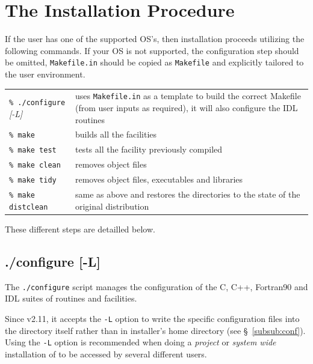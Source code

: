 \documentclass[12pt,twoside]{article}
\begin{document}

\section{The Installation Procedure}

If the user has one of the supported OS's, then installation proceeds utilizing
the following commands. If your OS is not supported, the configuration step
should be omitted, {\tt Makefile.in} should be copied as {\tt Makefile} and explicitly
tailored to the user environment.


\begin{flushright}
\begin{tabular}{p{0.3\hsize} p{0.60\hsize}}
{\tt \% ./configure} {\em [-L]}    & uses {\tt Makefile.in} as a template to build 
                         the correct Makefile (from user inputs as required), it
                         will also configure the IDL routines\\
{\tt \% make}           & builds all the facilities \\
{\tt \% make test}      & tests all the facility previously compiled \\
{\tt \% make clean}     & removes object files \\
{\tt \% make tidy}      & removes object files, executables and libraries \\
{\tt \% make distclean} & same as above and restores the directories to the state of the 
                          original distribution \\
\end{tabular}
\end{flushright}
These different steps are detailled below.

\subsection{./configure [-L]}

The {\tt ./configure} script manages the configuration of the C, C++,
Fortran90 and IDL suites of routines and facilities.

Since v2.11, it accepts the {\tt -L} option to write the \healpix specific configuration files
into the \healpix directory itself rather than in installer's home directory (see
\S~\ref{subsub:conf}).
Using the {\tt -L} option is recommended when doing a {\em project} or {\em system wide} installation of
\healpix to be accessed by several different users.
\end{document}
